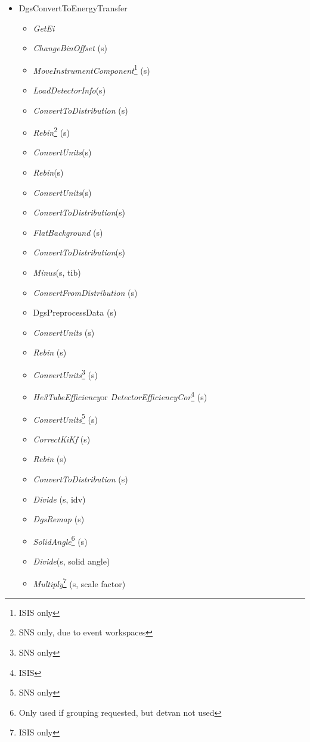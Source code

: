 \begin{itemize}
\item DgsConvertToEnergyTransfer
\begin{itemize}
\item \textit{GetEi}
\item \textit{ChangeBinOffset} (s)
\item \textit{MoveInstrumentComponent}\footnote{ISIS only} (s)
\item \textit{LoadDetectorInfo}\footnotemark[\value{footnote}] (s)
\item \textit{ConvertToDistribution} (s)
\item \textit{Rebin}\footnote{SNS only, due to event workspaces} (s)
\item \textit{ConvertUnits}\footnotemark[\value{footnote}] (s)
\item \textit{Rebin}\footnotemark[\value{footnote}] (s)
\item \textit{ConvertUnits}\footnotemark[\value{footnote}] (s)
\item \textit{ConvertToDistribution}\footnotemark[\value{footnote}] (s)
\item \textit{FlatBackground} (s)
\item \textit{ConvertToDistribution}\footnotemark[\value{footnote}] (s)
\item \textit{Minus}\footnotemark[\value{footnote}] (s, tib)
\item \textit{ConvertFromDistribution} (s)
\item DgsPreprocessData (s)
\item \textit{ConvertUnits} (s)
\item \textit{Rebin} (s)
\item \textit{ConvertUnits}\footnote{SNS only} (s)
\item \textit{He3TubeEfficiency}\footnotemark[\value{footnote}] or \textit{DetectorEfficiencyCor}\footnote{ISIS} (s)
\item \textit{ConvertUnits}\footnote{SNS only} (s)
\item \textit{CorrectKiKf} (s)
\item \textit{Rebin} (s)
\item \textit{ConvertToDistribution} (s)
\item \textit{Divide} (s, idv)
\item \textit{DgsRemap} (s)
\item \textit{SolidAngle}\footnote{Only used if grouping requested, but detvan not used} (s)
\item \textit{Divide}\footnotemark[\value{footnote}] (s, solid angle)
\item \textit{Multiply}\footnote{ISIS only} (s, scale factor)
\end{itemize}
\end{itemize}

